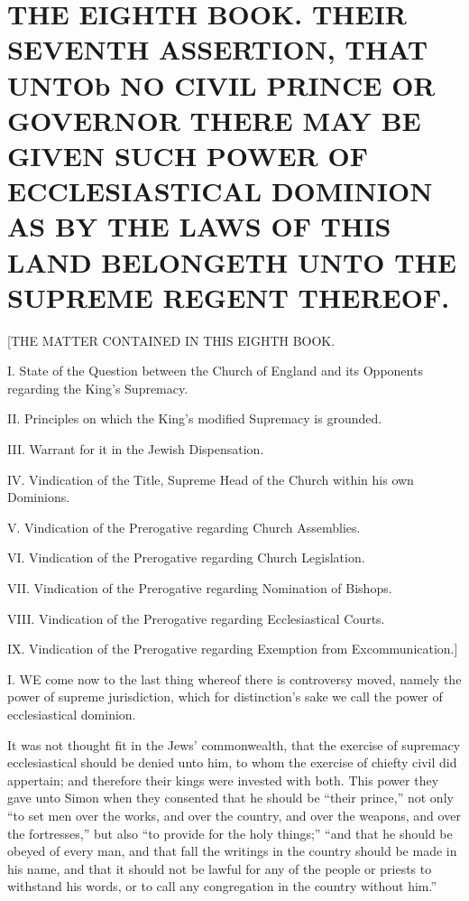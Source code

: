 \chapter*[The Eighth Book]{THE EIGHTH BOOK. 
THEIR SEVENTH ASSERTION, THAT UNTOb NO CIVIL PRINCE OR GOVERNOR THERE MAY BE GIVEN SUCH POWER OF ECCLESIASTICAL DOMINION AS BY THE LAWS OF THIS LAND BELONGETH UNTO THE SUPREME REGENT THEREOF.}
\label{chap:book8}



[THE MATTER CONTAINED IN THIS EIGHTH BOOK.

I. State of the Question between the Church of England and its Opponents regarding the King’s Supremacy.

II. Principles on which the King’s modified Supremacy is grounded.

III. Warrant for it in the Jewish Dispensation.

IV. Vindication of the Title, Supreme Head of the Church within his own Dominions.

V. Vindication of the Prerogative regarding Church Assemblies.

VI. Vindication of the Prerogative regarding Church Legislation.

VII. Vindication of the Prerogative regarding Nomination of Bishops.

VIII. Vindication of the Prerogative regarding Ecclesiastical Courts.

IX. Vindication of the Prerogative regarding Exemption from Excommunication.]


I. WE come now to the last thing whereof there is controversy moved, namely the power of supreme jurisdiction, which for distinction’s sake we call the power of ecclesiastical dominion.

It was not thought fit in the Jews’ commonwealth, that the exercise of supremacy ecclesiastical should be denied unto him, to whom the exercise of chiefty civil did appertain; and therefore their kings were invested with both. This power they gave unto Simon when they consented that he should be “their prince,” not only “to set men over the works, and over the country, and over the weapons, and over the fortresses,” but also “to provide for the holy things;” “and that he should be obeyed of every man, and that fall the writings in the country should be made in his name, and that it should not be lawful for any of the people or priests to withstand his words, or to call any congregation in the country without him.”

